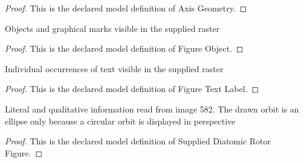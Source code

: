 \begin{proof}
  This is the declared model definition of Axis Geometry.
\end{proof}
\begin{definition}
  \label{def:physics:phyx-mini-0582:phyxminiproblems-problemphyxmini0582-figureobject}
  Objects and graphical marks visible in the supplied raster
\end{definition}
\begin{proof}
  This is the declared model definition of Figure Object.
\end{proof}
\begin{definition}
  \label{def:physics:phyx-mini-0582:phyxminiproblems-problemphyxmini0582-figuretextlabel}
  Individual occurrences of text visible in the supplied raster
\end{definition}
\begin{proof}
  This is the declared model definition of Figure Text Label.
\end{proof}
\begin{definition}
  \label{def:physics:phyx-mini-0582:phyxminiproblems-problemphyxmini0582-supplieddiatomicrotorfigure}
  Literal and qualitative information read from image 582. The drawn orbit is an ellipse only because a circular orbit is displayed in perspective
\end{definition}
\begin{proof}
  This is the declared model definition of Supplied Diatomic Rotor Figure.
\end{proof}
